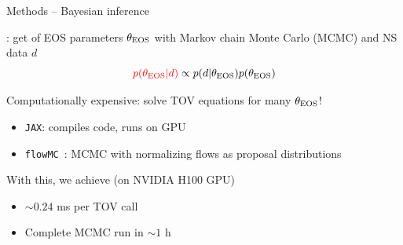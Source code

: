\documentclass[usenames,dvipsnames,t]{beamer}
\begin{document}
\begin{frame}{Methods -- Bayesian inference}

  \def\x{6mm}
  \def\y{1mm}

  : get  of EOS parameters $\theta_{\rm{EOS}}$ with Markov chain Monte Carlo (MCMC) and NS data $d$
  \begin{equation*}
      \textcolor{red}{p(\theta_{\rm{EOS}} | d)} \propto p(d | \theta_{\rm{EOS}}) p(\theta_{\rm{EOS}})
  \end{equation*}

  \vspace{\y}

  Computationally expensive: solve TOV equations for many $\theta_{\rm{EOS}}$!

  \begin{itemize}
    \vspace{\y}
    \item \texttt{JAX}: compiles code, runs on GPU
    
    \vspace{\y}
    \item \texttt{flowMC}~\cite{Gabrie:2021tlu,Wong:2022xvh}: MCMC with normalizing flows as proposal distributions
  \end{itemize}

  \vspace{\x}

  With this, we achieve (on NVIDIA H100 GPU)
  \begin{itemize}
    \vspace{\y}
    \item $\sim 0.24$ ms per TOV call
    
    \vspace{\y}
    \item Complete MCMC run in $\sim 1$ h 
  \end{itemize}
\end{frame}
\end{document}
